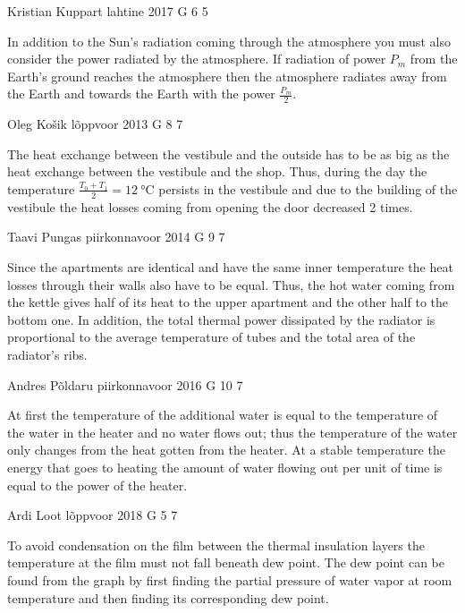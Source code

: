 \documentclass[11pt]{article}
\begin{document}
{Kristian Kuppart} %
{lahtine} %
{2017} %
{G 6} %
{5} %
{

\ifEngHint
In addition to the Sun’s radiation coming through the atmosphere you must also consider the power radiated by the atmosphere. If radiation of power $P_m$ from the Earth’s ground reaches the atmosphere then the atmosphere radiates away from the Earth and towards the Earth with the power $\frac{P_m}{2}$.
\fi
}

{Oleg Košik} %
{lõppvoor} %
{2013} %
{G 8} %
{7} %
{

\ifEngHint
The heat exchange between the vestibule and the outside has to be as big as the heat exchange between the vestibule and the shop. Thus, during the day the temperature $\frac{T_0+T_1}{2}=\SI{12}{\celsius}$ persists in the vestibule and due to the building of the vestibule the heat losses coming from opening the door decreased 2 times.
\fi
}

{Taavi Pungas} %
{piirkonnavoor} %
{2014} %
{G 9} %
{7} %
{

\ifEngHint
Since the apartments are identical and have the same inner temperature the heat losses through their walls also have to be equal. Thus, the hot water coming from the kettle gives half of its heat to the upper apartment and the other half to the bottom one. In addition, the total thermal power dissipated by the radiator is proportional to the average temperature of tubes and the total area of the radiator’s ribs.
\fi
}

{Andres Põldaru} %
{piirkonnavoor} %
{2016} %
{G 10} %
{7} %
{

\ifEngHint
At first the temperature of the additional water is equal to the temperature of the water in the heater and no water flows out; thus the temperature of the water only changes from the heat gotten from the heater. At a stable temperature the energy that goes to heating the amount of water flowing out per unit of time is equal to the power of the heater.
\fi
}

{Ardi Loot} %
{lõppvoor} %
{2018} %
{G 5} %
{7} %
{

\ifEngHint
To avoid condensation on the film between the thermal insulation layers the temperature at the film must not fall beneath dew point. The dew point can be found from the graph by first finding the partial pressure of water vapor at room temperature and then finding its corresponding dew point.
\fi
}
\end{document}
